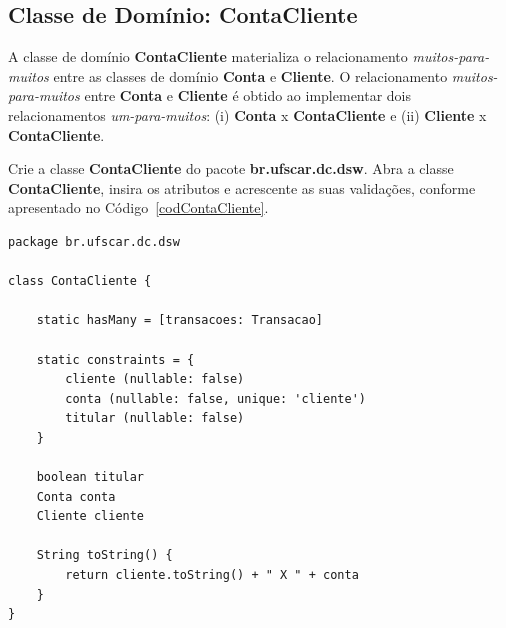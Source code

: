 \newpage

\subsection{Classe de Domínio: ContaCliente}\label{secContaCliente}

\vspace{0.5cm}

A  classe  de  domínio  {\bf  ContaCliente} materializa  o  relacionamento  {\em
  muitos-para-muitos} entre as classes de domínio {\bf Conta} e {\bf Cliente}. O
relacionamento  {\em muitos-para-muitos}  entre {\bf  Conta} e  {\bf  Cliente} é
obtido ao implementar dois relacionamentos {\em um-para-muitos}: (i) {\bf Conta}
x {\bf ContaCliente} e (ii) {\bf Cliente} x {\bf ContaCliente}.

\vspace{0.2cm}

Crie  a classe  {\bf ContaCliente}  do  pacote {\bf  br.ufscar.dc.dsw}.  Abra  a
classe {\bf ContaCliente}, insira os  atributos e acrescente as suas validações,
conforme apresentado no Código~\ref{codContaCliente}.  

\begin{lstlisting}[caption=Classe de  domínio {\bf ContaCliente},  frame = trBL,
    float=htbp, label=codContaCliente] 
package br.ufscar.dc.dsw

class ContaCliente {

    static hasMany = [transacoes: Transacao]
    
    static constraints = {
        cliente (nullable: false)
        conta (nullable: false, unique: 'cliente')
        titular (nullable: false)
    }
    
    boolean titular
    Conta conta
    Cliente cliente
    
    String toString() {
        return cliente.toString() + " X " + conta
    }
}
\end{lstlisting}

\hspace{1cm}\\
\hspace{1cm}\\

